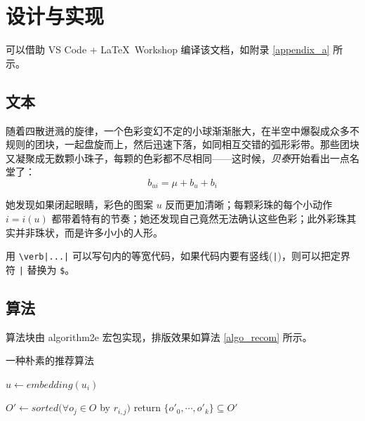 \documentclass[12]{ctexart}
\begin{document}




\section{设计与实现}

可以借助 VS Code + \LaTeX\ Workshop 编译该文档，如附录 \ref{appendix_a} 所示。

\subsection{文本}
 
随着四散迸溅的旋律，一个色彩变幻不定的小球渐渐胀大，在半空中爆裂成众多不规则的团块\cite{sklearn}，一起盘旋而上，然后迅速下落，如同相互交错的弧形彩带\cite{movielens}。那些团块又凝聚成无数颗小珠子，每颗的色彩都不尽相同——这时候，\emph{贝泰}开始看出一点名堂了：
\begin{equation}
    b_{ui} = \mu+b_u+b_i
\end{equation}

她发现如果闭起眼睛，彩色的图案 $u$ 反而更加清晰\cite{surprise}；每颗彩珠的每个小动作 $i=i(u)$ 都带着特有的节奏；她还发现自己竟然无法确认这些色彩；此外彩珠其实并非珠状，而是许多小小的人形。 

用 \verb$\verb|...|$ 可以写句内的等宽代码，如果代码内要有竖线(\verb$|$)，则可以把定界符 \verb$|$ 替换为 \verb|$|。

\subsection{算法 \label{knn} }

算法块由 algorithm2e 宏包\cite{algorithm2e}实现，排版效果如算法 \ref{algo_recom} 所示。

\begin{algorithm}[H]
    \caption{一种朴素的推荐算法}
    \label{algo_recom}



    $u \leftarrow embedding(u_i)$\;


    $O' \leftarrow sorted(\forall o_j \in O$ by $r_{i,j})$\;
    return $\{o'_0, \cdots, o'_k\} \subseteq  O'$\;
\end{algorithm}
\end{document}
